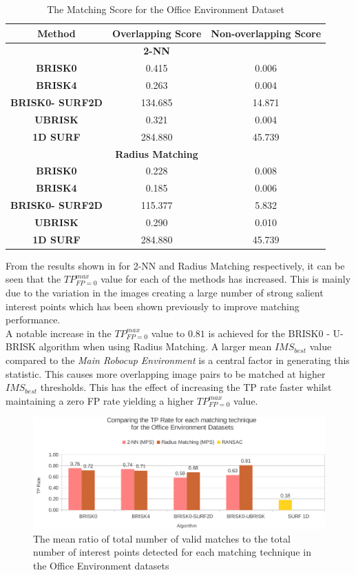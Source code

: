 \begin{table}
\centering
\caption{The Matching Score for the Office Environment Dataset}
\begin{tabular}{|c|c|c|}
\hline 
\textbf{Method} & \textbf{Overlapping Score} & \textbf{Non-overlapping Score}\tabularnewline
\hline 
\hline 
 & \textbf{2-NN} & \tabularnewline
\hline 
\textbf{BRISK0} & 0.415 & 0.006\tabularnewline
\hline 
\textbf{BRISK4} & 0.263 & 0.004\tabularnewline
\hline 
\textbf{BRISK0- SURF2D} & 134.685 & 14.871\tabularnewline
\hline 
\textbf{UBRISK} & 0.321 & 0.004\tabularnewline
\hline 
\textbf{1D SURF} & 284.880 & 45.739\tabularnewline
\hline 
 & \textbf{Radius Matching} & \tabularnewline
\hline 
\textbf{BRISK0} & 0.228 & 0.008\tabularnewline
\hline 
\textbf{BRISK4} & 0.185 & 0.006\tabularnewline
\hline 
\textbf{BRISK0- SURF2D} & 115.377 & 5.832\tabularnewline
\hline 
\textbf{UBRISK} & 0.290 & 0.010\tabularnewline
\hline 
\textbf{1D SURF} & 284.880 & 45.739\tabularnewline
\hline 
\end{tabular}
\label{tab:oeMS}
\end{table}


From the results shown in  for 2-NN and Radius Matching respectively, it can be seen that the $TP_{FP=0}^{max}$ value for each of the methods has increased. This is mainly due to the variation in the images creating a large number of strong salient interest points which has been shown previously to improve matching performance.\\

A notable increase in the $TP_{FP=0}^{max}$ value to $0.81$ is achieved for the BRISK0 - U-BRISK algorithm when using Radius Matching. A larger mean $IMS_{best}$ value compared to the \textit{Main Robocup Environment} is a central factor in generating this statistic. This causes more overlapping image pairs to be matched at higher $IMS_{best}$ thresholds. This has the effect of increasing the TP rate faster whilst maintaining a zero FP rate yielding a higher $TP_{FP=0}^{max}$ value.\\

\begin{figure}
  \centering
    \includegraphics[width=1.0\textwidth]{../Drawings/Graphs/tp_rate_oe.pdf}
    \caption{The mean ratio of total number of valid matches to the total number of interest points detected for each matching technique in the Office Environment datasets} 
    \label{fig:tp_rate_oe}
\end{figure}

